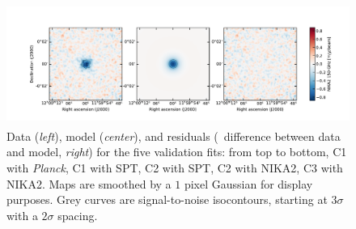 \begin{figure}[t]
    \includegraphics[height=4cm, trim={2cm 0.7cm 1.5cm 1.5cm}, clip]{../validation/results/C3/NIKA2/data_model_residuals_maps.pdf}
    \caption{
        Data (\textit{left}), model (\textit{center}), and residuals (\ie\ difference between data and model, \textit{right}) for the five validation fits:
        from top to bottom, C1 with \textit{Planck}, C1 with SPT, C2 with SPT, C2 with NIKA2, C3 with NIKA2.
        Maps are smoothed by a $1$ pixel Gaussian for display purposes.
        Grey curves are signal-to-noise isocontours, starting at $3\sigma$ with a $2\sigma$ spacing.
    }
    \label{fig:valid:dmr_2d}
\end{figure}


